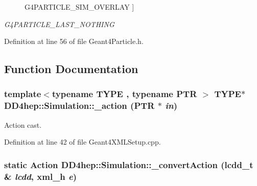 \begin{Desc}
\begin{description}
{\hypertarget{namespace_d_d4hep_1_1_simulation_a88917bdf7f18e2bbd7c9942c897f100cae3998278e07a5db06e4630716a509895}{
G4PARTICLE\_\-SIM\_\-OVERLAY}
\label{namespace_d_d4hep_1_1_simulation_a88917bdf7f18e2bbd7c9942c897f100cae3998278e07a5db06e4630716a509895}
}]\item[{\em 
\hypertarget{namespace_d_d4hep_1_1_simulation_a88917bdf7f18e2bbd7c9942c897f100ca72fc2c485457f327f2f958ea2d08a7b1}{
G4PARTICLE\_\-LAST\_\-NOTHING}
\label{namespace_d_d4hep_1_1_simulation_a88917bdf7f18e2bbd7c9942c897f100ca72fc2c485457f327f2f958ea2d08a7b1}
}]\end{description}
\end{Desc}



Definition at line 56 of file Geant4Particle.h.

\subsection{Function Documentation}
\hypertarget{namespace_d_d4hep_1_1_simulation_a48f76eb1067558c924d3417d40fbb060}{
\subsubsection[{\_\-action}]{\setlength{\rightskip}{0pt plus 5cm}template$<$typename TYPE , typename PTR $>$ TYPE$\ast$ DD4hep::Simulation::\_\-action (PTR $\ast$ {\em in})}}
\label{namespace_d_d4hep_1_1_simulation_a48f76eb1067558c924d3417d40fbb060}


Action cast. 

Definition at line 42 of file Geant4XMLSetup.cpp.\hypertarget{namespace_d_d4hep_1_1_simulation_a4a3e1d80b410fdc413e130d69c311891}{
\subsubsection[{\_\-convertAction}]{\setlength{\rightskip}{0pt plus 5cm}static {\bf Action} DD4hep::Simulation::\_\-convertAction ({\bf lcdd\_\-t} \& {\em lcdd}, \/  {\bf xml\_\-h} {\em e})}}
\label{namespace_d_d4hep_1_1_simulation_a4a3e1d80b410fdc413e130d69c311891}


